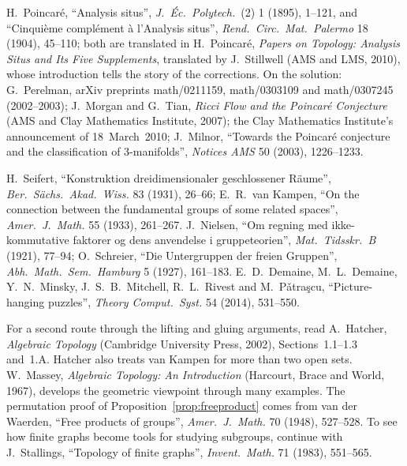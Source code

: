 H.~Poincar\'e, ``Analysis situs'', \emph{J.\ \'Ec.\ Polytech.}\ (2) 1 (1895), 1--121, and ``Cinqui\`eme compl\'ement \`a l'Analysis situs'', \emph{Rend.\ Circ.\ Mat.\ Palermo} 18 (1904), 45--110; both are
translated in H.~Poincar\'e, \emph{Papers on Topology: Analysis Situs and Its Five Supplements}, translated by J.~Stillwell (AMS and LMS, 2010), whose introduction tells the story of the corrections. On the
solution: G.~Perelman, arXiv preprints math/0211159, math/0303109 and math/0307245 (2002--2003); J.~Morgan and G.~Tian, \emph{Ricci Flow and the Poincar\'e Conjecture} (AMS and Clay Mathematics
Institute, 2007); the Clay Mathematics Institute's announcement of 18~March~2010; J.~Milnor, ``Towards the Poincar\'e conjecture and the classification of 3-manifolds'', \emph{Notices AMS} 50 (2003), 1226--1233.

H.~Seifert, ``Kon\-struk\-tion drei\-di\-men\-sio\-na\-ler ge\-schlos\-se\-ner R\"aume'', \emph{Ber.\ S\"achs.\ Akad.\ Wiss.} 83 (1931), 26--66; E.~R.~van Kampen, ``On the connection between the fundamental groups of
some related spaces'', \emph{Amer.\ J.\ Math.} 55 (1933), 261--267. J.~Nielsen, ``Om regning med ikke-kommutative faktorer og dens anvendelse i gruppeteorien'', \emph{Mat.\ Tidsskr.\ B} (1921), 77--94;
O.~Schreier, ``Die Untergruppen der freien Gruppen'', \emph{Abh.\ Math.\ Sem.\ Hamburg} 5 (1927), 161--183. E.~D.~Demaine, M.~L.~Demaine, Y.~N.~Minsky, J.~S.~B.~Mitchell, R.~L.~Rivest and M.~P\v atra\c scu,
``Picture-hanging puzzles'', \emph{Theory Comput.\ Syst.} 54 (2014), 531--550.

For a second route through the lifting and gluing arguments, read A.~Hatcher, \emph{Algebraic Topology} (Cambridge University Press, 2002), Sections~1.1--1.3 and~1.A. Hatcher also treats van Kampen for more than two open sets. W.~Massey, \emph{Algebraic Topology: An Introduction} (Harcourt, Brace and World, 1967), develops the geometric viewpoint through many examples. The permutation proof of Proposition~\ref{prop:freeproduct} comes from van der Waerden, ``Free products of groups'', \emph{Amer.\ J.\ Math.} 70 (1948), 527--528. To see how finite graphs become tools for studying subgroups, continue with J.~Stallings, ``Topology of finite graphs'', \emph{Invent.\ Math.} 71 (1983), 551--565.
